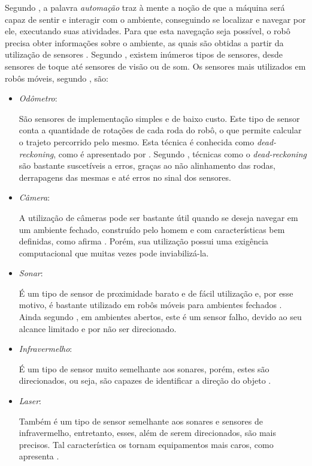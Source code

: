 Segundo \cite{roboticaIndustrial}, a palavra \textit{automação} traz à mente a noção de que a máquina será capaz de sentir e interagir com o ambiente, conseguindo se localizar e navegar por ele, executando suas atividades. Para que esta navegação seja possível, o robô precisa obter informações sobre o ambiente, as quais são obtidas a partir da utilização de sensores \cite{simpleMobile}. Segundo \cite{agenteExploratorioKalman}, existem inúmeros tipos de sensores, desde sensores de toque até sensores de visão ou de som. Os sensores mais utilizados em robôs móveis, segundo \cite{agenteExploratorioKalman}, são:
\begin{itemize}
	\item \textit{Odômetro}:

		São sensores de implementação simples e de baixo custo. Este tipo de sensor conta a quantidade de rotações de cada roda do robô, o que permite calcular o trajeto percorrido pelo mesmo. Esta técnica é conhecida como \textit{dead-reckoning}, como é apresentado por \cite{integrationVisionSLAMnonlinear}. Segundo \cite{agenteExploratorioKalman}, técnicas como o \textit{dead-reckoning} são bastante suscetíveis a erros, graças ao não alinhamento das rodas, derrapagens das mesmas e até erros no sinal dos sensores.

	\item \textit{Câmera}:

		A utilização de câmeras pode ser bastante útil quando se deseja navegar em um ambiente fechado, construído pelo homem e com características bem definidas, como afirma \cite{agenteExploratorioKalman}. Porém, sua utilização possui uma exigência computacional \cite{localizacaoEMapeamentoPaulo} que muitas vezes pode inviabilizá-la.

	\item \textit{Sonar}:

		É um tipo de sensor de proximidade barato e de fácil utilização e, por esse motivo, é bastante utilizado em robôs móveis para ambientes fechados \cite{agenteExploratorioKalman}. Ainda segundo \cite{agenteExploratorioKalman}, em ambientes abertos, este é um sensor falho, devido ao seu alcance limitado e por não ser direcionado.

	\item \textit{Infravermelho}:

		É um tipo de sensor muito semelhante aos sonares, porém, estes são direcionados, ou seja, são capazes de identificar a direção do objeto \cite{theCleaningProject}.

	\item \textit{Laser}:

		Também é um tipo de sensor semelhante aos sonares e sensores de infravermelho, entretanto, esses, além de serem direcionados, são mais precisos. Tal característica os tornam equipamentos mais caros, como apresenta \cite{agenteExploratorioKalman}.

\end{itemize}

